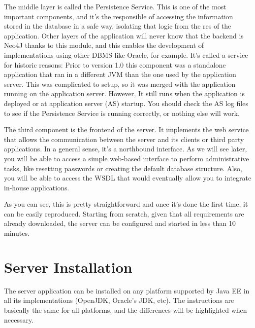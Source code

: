 \documentclass[a4paper]{article}
\begin{document}
		The middle layer is called the Persistence Service. This is one of the most important components, and it's the responsible of accessing the information stored in the database in a safe way, isolating that logic from the res of the application. Other layers of the application will never know that the backend is Neo4J thanks to this module, and this enables the development of implementations using other DBMS like Oracle, for example. It's called a service for historic reasons: Prior to version 1.0 this component was a standalone application that ran in a different JVM than the one used by the application server. This was complicated to setup, so it was merged with the application running on the application server. However, It still runs when the application is deployed or at application server (AS) startup. You should check the AS log files to see if the Persistence Service is running correctly, or nothing else will work.\newline
		
		The third component is the frontend of the server. It implements the web service that allows the communication between the server and its clients or third party applications. In a general sense, it's a northbound interface. As we will see later, you will be able to access a simple web-based interface to perform administrative tasks, like resetting passwords or creating the default database structure. Also, you will be able to access the WSDL that would eventually allow you to integrate in-house applications.\newline
		
		As you can see, this is pretty straightforward and once it's done the first time, it can be easily reproduced. Starting from scratch, given that all requirements are already downloaded, the server can be configured and started in less than 10 minutes.
	\newpage
	
	\section{Server Installation}
		The server application can be installed on any platform supported by Java EE in all its implementations (OpenJDK, Oracle's JDK, etc). The instructions are basically the same for all platforms, and the differences will be highlighted when necessary.
\end{document}
